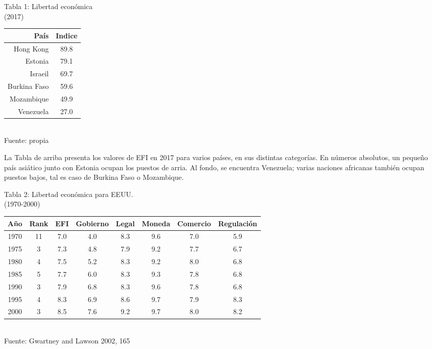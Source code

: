     \begin{center}
	Tabla 1: Libertad económica\\(2017)\\
	\begin{tabular}{r|c}
	    \hline
	    \textbf{País} & \textbf{Indice} \\
	    \hline
	    Hong Kong & 89.8 \\
	    Estonia & 79.1 \\
	    Israeil & 69.7 \\
	    Burkina Faso & 59.6 \\
	    Mozambique & 49.9 \\
	    Venezuela & 27.0 \\
	    \hline
	\end{tabular}\\
	\small{Fuente: propia}
    \end{center}
    \vspace{.5cm}

    La Tabla de arriba presenta los valores de EFI en 2017 para varios países, en sus distintas categorías. En números absolutos, un pequeño país asiático junto con Estonia ocupan los puestos de arria. Al fondo, se encuentra Venezuela; varias naciones africanas también ocupan puestos bajos, tal es caso de Burkina Faso o Mozambique.\\


    \begin{center}
	Tabla 2: Libertad económica para EEUU.\\
	(1970-2000)\\
	\begin{tabular}{cccccccc}
	    \hline
	    Año&Rank&EFI&Gobierno&Legal&Moneda&Comercio&Regulación\\
	    \hline
	    1970&11&7.0&4.0&8.3&9.6&7.0&5.9\\
	    1975&3&7.3&4.8&7.9&9.2&7.7&6.7\\
	    1980&4&7.5&5.2&8.3&9.2&8.0&6.8\\
	    1985&5&7.7&6.0&8.3&9.3&7.8&6.8\\
	    1990&3&7.9&6.8&8.3&9.6&7.8&6.8\\
	    1995&4&8.3&6.9&8.6&9.7&7.9&8.3\\
	    2000&3&8.5&7.6&9.2&9.7&8.0&8.2\\
	    \hline
	\end{tabular}\\
	\small{Fuente: Gwartney and Lawson 2002, 165}
    \end{center}

